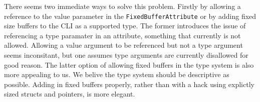 There seems two immediate ways to solve this problem. Firstly by allowing a reference to the value parameter in the 
\texttt{FixedBufferAttribute} or by adding fixed size buffers to the CLI as a supported type. The former introduces the 
issue of referencing a type paramater in an attribute, something that currently is not allowed. Allowing a value argument to 
be referenced but not a type argument seems inconsitant, but one assumes type arguments are currently disallowed for good reason.
The latter option of allowing fixed buffers in the type system is also more appealing to us. We belive the type system should be 
descriptive as possible. Adding in fixed buffers properly, rather than with a hack using explictly sized structs and pointers, is 
more elegant.